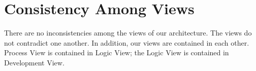 \chapter{Consistency Among Views}
There are no inconsistencies among the views of our architecture. The views do not contradict one another. In addition, our views are contained in each other. Process View is contained in Logic View; the Logic View is contained in Development View.